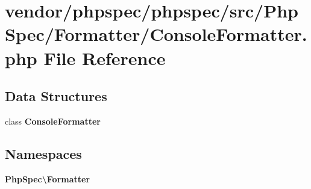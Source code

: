 \section{vendor/phpspec/phpspec/src/\+Php\+Spec/\+Formatter/\+Console\+Formatter.php File Reference}
\label{_console_formatter_8php}
\subsection*{Data Structures}
\begin{DoxyCompactItemize}
\item 
class {\bf Console\+Formatter}
\end{DoxyCompactItemize}
\subsection*{Namespaces}
\begin{DoxyCompactItemize}
\item 
 {\bf Php\+Spec\textbackslash{}\+Formatter}
\end{DoxyCompactItemize}
